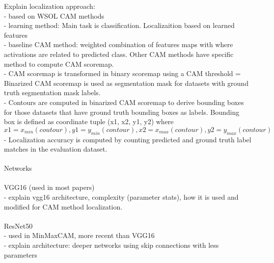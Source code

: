 Explain localization approach:\\
- based on WSOL CAM methods\\
- learning method: Main task is classification. Localizaition based on learned features\\
- baseline CAM method: weighted combination of features maps with where activations are related to predicted class. Other CAM methods have specific method to compute CAM scoremap.\\
- CAM scoremap is transformed in binary scoremap using a CAM threshold
= Binarized CAM scoremap is used as segmentation mask for datasets with ground truth segmentation mask labels.\\
- Contours are computed in binarized CAM scoremap to derive bounding boxes for those datasets that have ground truth bounding boxes as labels. Bounding box is defined as coordinate tuple (x1, x2, y1, y2) where $x1 = x_{min}(coutour), y1 = y_{min}(contour), x2 = x_{max}(contour), y2 = y_{max}(contour)$\\
- Localization accuracy is computed by counting predicted and ground truth label matches in the evaluation dataset.\\
\\
Networks\\
\\
VGG16 (used in most papers)\\
- explain vgg16 architecture, complexity (parameter stats), how it is used and modified for 
CAM method localization.\\
\\
ResNet50 \\
- used in MinMaxCAM, more recent than VGG16\\
- explain architecture: deeper networks using skip connections with less parameters\\
\\

